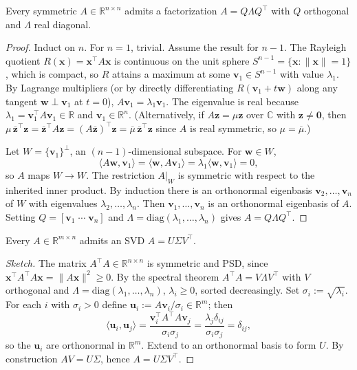 \begin{theorem}
Every symmetric $A\in\mathbb{R}^{n\times n}$ admits a factorization $A=Q\Lambda Q^\top$ with $Q$ orthogonal and $\Lambda$ real diagonal.
\end{theorem}
\begin{proof}
Induct on $n$. For $n=1$, trivial. Assume the result for $n-1$. The Rayleigh quotient $R(\mathbf{x})=\mathbf{x}^\top A\mathbf{x}$ is continuous on the unit sphere $S^{n-1}=\{\mathbf{x}:\|\mathbf{x}\|=1\}$, which is compact, so $R$ attains a maximum at some $\mathbf{v}_1\in S^{n-1}$ with value $\lambda_1$. By Lagrange multipliers (or by directly differentiating $R(\mathbf{v}_1+t\mathbf{w})$ along any tangent $\mathbf{w}\perp\mathbf{v}_1$ at $t=0$), $A\mathbf{v}_1=\lambda_1\mathbf{v}_1$. The eigenvalue is real because $\lambda_1=\mathbf{v}_1^\top A\mathbf{v}_1\in\mathbb{R}$ and $\mathbf{v}_1\in\mathbb{R}^n$. (Alternatively, if $A\mathbf{z}=\mu\mathbf{z}$ over $\mathbb{C}$ with $\mathbf{z}\ne\mathbf{0}$, then $\mu\,\overline{\mathbf{z}}^\top\mathbf{z}=\overline{\mathbf{z}}^\top A\mathbf{z}=(A\overline{\mathbf{z}})^\top\mathbf{z}=\overline{\mu}\,\overline{\mathbf{z}}^\top\mathbf{z}$ since $A$ is real symmetric, so $\mu=\overline{\mu}$.)

Let $W=\{\mathbf{v}_1\}^{\perp}$, an $(n-1)$-dimensional subspace. For $\mathbf{w}\in W$,
\[
\langle A\mathbf{w},\mathbf{v}_1\rangle=\langle\mathbf{w},A\mathbf{v}_1\rangle=\lambda_1\langle\mathbf{w},\mathbf{v}_1\rangle=0,
\]
so $A$ maps $W\to W$. The restriction $A|_W$ is symmetric with respect to the inherited inner product. By induction there is an orthonormal eigenbasis $\mathbf{v}_2,\dots,\mathbf{v}_n$ of $W$ with eigenvalues $\lambda_2,\dots,\lambda_n$. Then $\mathbf{v}_1,\dots,\mathbf{v}_n$ is an orthonormal eigenbasis of $A$. Setting $Q=[\mathbf{v}_1\;\cdots\;\mathbf{v}_n]$ and $\Lambda=\mathrm{diag}(\lambda_1,\dots,\lambda_n)$ gives $A=Q\Lambda Q^\top$.
\end{proof}

\begin{theorem}
Every $A\in\mathbb{R}^{m\times n}$ admits an SVD $A=U\Sigma V^\top$.
\end{theorem}
\begin{proof}[Sketch]
The matrix $A^\top A\in\mathbb{R}^{n\times n}$ is symmetric and PSD, since $\mathbf{x}^\top A^\top A\mathbf{x}=\|A\mathbf{x}\|^2\ge 0$. By the spectral theorem $A^\top A=V\Lambda V^\top$ with $V$ orthogonal and $\Lambda=\mathrm{diag}(\lambda_1,\dots,\lambda_n)$, $\lambda_i\ge 0$, sorted decreasingly. Set $\sigma_i:=\sqrt{\lambda_i}$. For each $i$ with $\sigma_i>0$ define $\mathbf{u}_i:=A\mathbf{v}_i/\sigma_i\in\mathbb{R}^m$; then
\[
\langle\mathbf{u}_i,\mathbf{u}_j\rangle=\frac{\mathbf{v}_i^\top A^\top A\mathbf{v}_j}{\sigma_i\sigma_j}=\frac{\lambda_j\delta_{ij}}{\sigma_i\sigma_j}=\delta_{ij},
\]
so the $\mathbf{u}_i$ are orthonormal in $\mathbb{R}^m$. Extend to an orthonormal basis to form $U$. By construction $A V=U\Sigma$, hence $A=U\Sigma V^\top$.
\end{proof}

